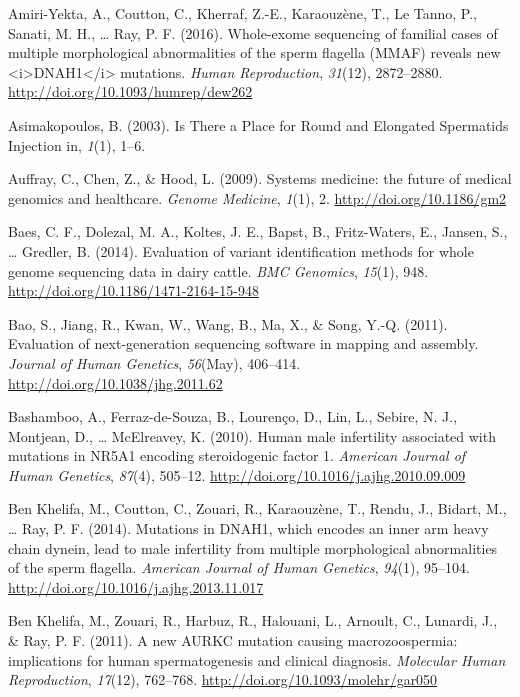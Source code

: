 \documentclass[12pt,twoside]{reedthesis}
\theoremstyle{definition}
\theoremstyle{definition}
\theoremstyle{remark}
\begin{document}
  \hypertarget{ref-Amiri-Yekta2016}{}
  Amiri-Yekta, A., Coutton, C., Kherraf, Z.-E., Karaouzène, T., Le Tanno,
  P., Sanati, M. H., \ldots{} Ray, P. F. (2016). Whole-exome sequencing of
  familial cases of multiple morphological abnormalities of the sperm
  flagella (MMAF) reveals new
  \textless{}i\textgreater{}DNAH1\textless{}/i\textgreater{} mutations.
  \emph{Human Reproduction}, \emph{31}(12), 2872--2880.
  \url{http://doi.org/10.1093/humrep/dew262}
  
  \hypertarget{ref-Asimakopoulos2003}{}
  Asimakopoulos, B. (2003). Is There a Place for Round and Elongated
  Spermatids Injection in, \emph{1}(1), 1--6.
  
  \hypertarget{ref-Auffray2009}{}
  Auffray, C., Chen, Z., \& Hood, L. (2009). Systems medicine: the future
  of medical genomics and healthcare. \emph{Genome Medicine}, \emph{1}(1),
  2. \url{http://doi.org/10.1186/gm2}
  
  \hypertarget{ref-Baes2014}{}
  Baes, C. F., Dolezal, M. A., Koltes, J. E., Bapst, B., Fritz-Waters, E.,
  Jansen, S., \ldots{} Gredler, B. (2014). Evaluation of variant
  identification methods for whole genome sequencing data in dairy cattle.
  \emph{BMC Genomics}, \emph{15}(1), 948.
  \url{http://doi.org/10.1186/1471-2164-15-948}
  
  \hypertarget{ref-Bao2011}{}
  Bao, S., Jiang, R., Kwan, W., Wang, B., Ma, X., \& Song, Y.-Q. (2011).
  Evaluation of next-generation sequencing software in mapping and
  assembly. \emph{Journal of Human Genetics}, \emph{56}(May), 406--414.
  \url{http://doi.org/10.1038/jhg.2011.62}
  
  \hypertarget{ref-Bashamboo2010}{}
  Bashamboo, A., Ferraz-de-Souza, B., Lourenço, D., Lin, L., Sebire, N.
  J., Montjean, D., \ldots{} McElreavey, K. (2010). Human male infertility
  associated with mutations in NR5A1 encoding steroidogenic factor 1.
  \emph{American Journal of Human Genetics}, \emph{87}(4), 505--12.
  \url{http://doi.org/10.1016/j.ajhg.2010.09.009}
  
  \hypertarget{ref-BenKhelifa2014}{}
  Ben Khelifa, M., Coutton, C., Zouari, R., Karaouzène, T., Rendu, J.,
  Bidart, M., \ldots{} Ray, P. F. (2014). Mutations in DNAH1, which
  encodes an inner arm heavy chain dynein, lead to male infertility from
  multiple morphological abnormalities of the sperm flagella.
  \emph{American Journal of Human Genetics}, \emph{94}(1), 95--104.
  \url{http://doi.org/10.1016/j.ajhg.2013.11.017}
  
  \hypertarget{ref-BenKhelifa2011}{}
  Ben Khelifa, M., Zouari, R., Harbuz, R., Halouani, L., Arnoult, C.,
  Lunardi, J., \& Ray, P. F. (2011). A new AURKC mutation causing
  macrozoospermia: implications for human spermatogenesis and clinical
  diagnosis. \emph{Molecular Human Reproduction}, \emph{17}(12), 762--768.
  \url{http://doi.org/10.1093/molehr/gar050}
  
\end{document}
